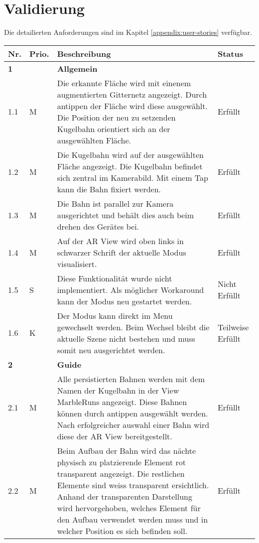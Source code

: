 \section{Validierung}

Die detailierten Anforderungen sind im Kapitel \ref{appendix:user-stories} verfügbar.

\begin{longtable}{l l p{10cm} l}
	\hline
	\textbf{Nr.} & \textbf{Prio.} & \textbf{Beschreibung} & \textbf{Status} \\
	\hline
	\textbf{1} & & \textbf{Allgemein} & \\
	\hline
	1.1 & M & Die erkannte Fläche wird mit einenem augmentierten Gitternetz angezeigt. Durch antippen der Fläche wird diese ausgewählt. Die Position der neu zu setzenden Kugelbahn orientiert sich an der ausgewählten Fläche. & Erfüllt \\
	1.2 & M & Die Kugelbahn wird auf der ausgewählten Fläche angezeigt. Die Kugelbahn befindet sich zentral im Kamerabild. Mit einem Tap kann die Bahn fixiert werden. & Erfüllt \\
	1.3 & M & Die Bahn ist parallel zur Kamera ausgerichtet und behält dies auch beim drehen des Gerätes bei. & Erfüllt \\
	1.4 & M & Auf der AR View wird oben links in schwarzer Schrift der aktuelle Modus visualisiert. & Erfüllt \\
	1.5 & S & Diese Funktionalität wurde nicht implementiert. Als möglicher Workaround kann der Modus neu gestartet werden. & Nicht Erfüllt \\
	1.6 & K & Der Modus kann direkt im Menu gewechselt werden. Beim Wechsel bleibt die aktuelle Szene nicht bestehen und muss somit neu ausgerichtet werden. & Teilweise Erfüllt \\
	\hline
	\textbf{2} & & \textbf{Guide} & \\
	\hline
	2.1 & M & Alle persistierten Bahnen werden mit dem Namen der Kugelbahn in der View MarbleRuns angezeigt. Diese Bahnen können durch antippen ausgewählt werden. Nach erfolgreicher auswahl einer Bahn wird diese der AR View bereitgestellt. & Erfüllt \\
	2.2 & M & Beim Aufbau der Bahn wird das nächte physisch zu platzierende Element rot transparent angezeigt. Die restlichen Elemente sind weiss transparent ersichtlich. Anhand der transparenten Darstellung wird hervorgehoben, welches Element für den Aufbau verwendet werden muss und in welcher Position es sich befinden soll.  & Erfüllt \\

\end{longtable}
